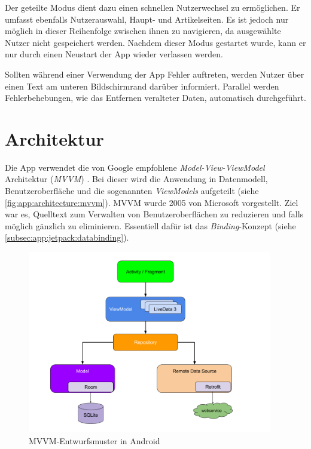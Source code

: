 Der geteilte Modus dient dazu einen schnellen Nutzerwechsel zu ermöglichen.
Er umfasst ebenfalls Nutzerauswahl, Haupt- und Artikelseiten.
Es ist jedoch nur möglich in dieser Reihenfolge zwischen ihnen zu navigieren, da ausgewählte Nutzer nicht gespeichert werden.
Nachdem dieser Modus gestartet wurde, kann er nur durch einen Neustart der App wieder verlassen werden.

Sollten während einer Verwendung der App Fehler auftreten, werden Nutzer über einen Text am unteren Bildschirmrand darüber informiert.
Parallel werden Fehlerbehebungen, wie das Entfernen veralteter Daten, automatisch durchgeführt.

\section{Architektur}
\label{sec:app:architecture}
Die App verwendet die von Google empfohlene \textit{Model-View-ViewModel} Architektur (\textit{MVVM}) \autocite{androidarchitecture}.
Bei dieser wird die Anwendung in Datenmodell, Benutzeroberfläche und die sogenannten \textit{ViewModels} aufgeteilt (siehe \autoref{fig:app:architecture:mvvm}).
MVVM wurde 2005 von Microsoft vorgestellt.
Ziel war es, Quelltext zum Verwalten von Benutzeroberflächen zu reduzieren und falls möglich gänzlich zu eliminieren.
Essentiell dafür ist das \textit{Binding}-Konzept (siehe \autoref{subsec:app:jetpack:databinding}).

\begin{figure}[!htb]%
	\centering
	\includegraphics[height=8cm,keepaspectratio]{./img/android-architecture.png}
	\caption{MVVM-Entwurfsmuster in Android \autocite{androidarchitecture}}
	\label{fig:app:architecture:mvvm}
\end{figure}


